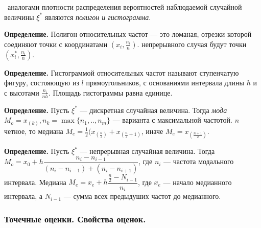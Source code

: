 \documentclass[9pt]{article}
\begin{document}
\ 
 аналогами плотности распределения вероятностей наблюдаемой случайной величины \(\xi^*\) являются \textit{полигон и гистограмма}.
\par\textbf{Определение.} Полигон относительных частот --- это ломаная, отрезки которой соединяют точки с координатами \((x_i,\frac{n_i}{n})\).
\parДля непрерывного случая будут точки \((x_i^*,\frac{n_i}{n})\).
\par\textbf{Определение.} Гистограммой относительных частот называют ступенчатую фигуру, состояющую из \(l\) прямоугольников, с основаниями интервала длины \(h\) и с высотами \(\frac{n_i}{nh}\). Площадь гистограммы равна единице.
\par\textbf{Определение.} Пусть \(\xi^*\) --- дискретная случайная величина. Тогда \textit{мода} \(M_o=x_{(k)}, n_k=\max\{n_1,..,n_m\}\) --- варианта с максимальной частотой.
\parЕсли \(n\) четное, то медиана \(M_e=\frac{1}{2}(x_{(\frac{n}{2})}+x_{(\frac{n}{2}+1)}\), иначе \(M_e=x_{(\frac{n+1}{2})}\).
\par\textbf{Определение.} Пусть \(\xi^*\) --- непрерывная случайная величина. Тогда \(M_o=x_0+h\dfrac{n_i-n_{i-1}}{(n_i-n_{i-1})+(n_i-n_{i+1})}\), где \(n_i\) --- частота модального интервала. Медиана \(M_e=x_e+h\dfrac{\frac{n}{2}-N_{i-1}}{n_i}\), где \(x_e\) --- начало медианного интервала, а \(N_{i-1}\) --- сумма всех предыдуших частот до медианного.

\subsubsection{Точечные оценки. Свойства оценок.}
\end{document}
